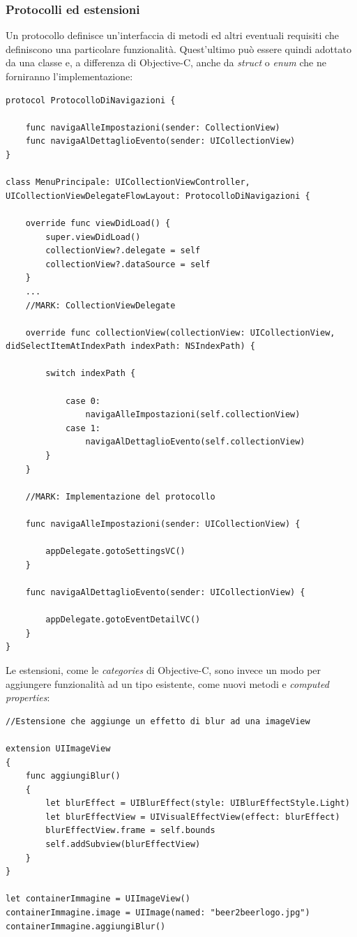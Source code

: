 \subsubsection{Protocolli ed estensioni}
Un protocollo definisce un'interfaccia di metodi ed altri eventuali requisiti che definiscono una particolare funzionalità. Quest'ultimo può essere quindi adottato da una classe e, a differenza di Objective-C, anche da \textit{struct} o \textit{enum} che ne forniranno l'implementazione:
\lstset{language=[Objective]C, breakindent=40pt, breaklines}
\begin{lstlisting}
protocol ProtocolloDiNavigazioni {
	
	func navigaAlleImpostazioni(sender: CollectionView) 
	func navigaAlDettaglioEvento(sender: UICollectionView)
}

class MenuPrincipale: UICollectionViewController, UICollectionViewDelegateFlowLayout: ProtocolloDiNavigazioni {

	override func viewDidLoad() {
        super.viewDidLoad()
		collectionView?.delegate = self
		collectionView?.dataSource = self
	}
	...
	//MARK: CollectionViewDelegate 
	
	override func collectionView(collectionView: UICollectionView, didSelectItemAtIndexPath indexPath: NSIndexPath) {
		
		switch indexPath {
			
			case 0: 
				navigaAlleImpostazioni(self.collectionView)
			case 1:
				navigaAlDettaglioEvento(self.collectionView)
		}
	}	
		
	//MARK: Implementazione del protocollo 
		
	func navigaAlleImpostazioni(sender: UICollectionView) {
        
        appDelegate.gotoSettingsVC()
    }
    
    func navigaAlDettaglioEvento(sender: UICollectionView) {
        
        appDelegate.gotoEventDetailVC()
    }
}
\end{lstlisting}
Le estensioni, come le \textit{categories} di Objective-C, sono invece un modo per aggiungere funzionalità ad un tipo esistente, come nuovi metodi e \textit{computed properties}:
\lstset{language=[Objective]C, breakindent=40pt, breaklines}
\begin{lstlisting}
//Estensione che aggiunge un effetto di blur ad una imageView

extension UIImageView
{
    func aggiungiBlur()
    {
        let blurEffect = UIBlurEffect(style: UIBlurEffectStyle.Light)
        let blurEffectView = UIVisualEffectView(effect: blurEffect)
        blurEffectView.frame = self.bounds
        self.addSubview(blurEffectView)
    }
}

let containerImmagine = UIImageView()
containerImmagine.image = UIImage(named: "beer2beerlogo.jpg")
containerImmagine.aggiungiBlur()
\end{lstlisting}\newpage
